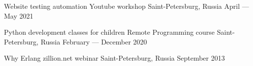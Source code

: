

\begin{cventries}

  \cventry
    {Website testing automation} %
    {Youtube workshop} %
    {Saint-Petersburg, Russia} %
    {April --- May 2021} %
    {}

  \cventry
    {Python development classes for children}
    {Remote Programming course}
    {Saint-Petersburg, Russia}
    {February --- December 2020} %
    {
    }

  \cventry
    {Why Erlang}
    {zillion.net webinar} %
    {Saint-Petersburg, Russia} %
    {September 2013} %
    {
    }

\end{cventries}
